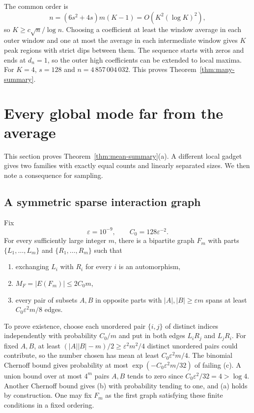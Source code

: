 \documentclass[11pt,a4paper]{article}
\theoremstyle{definition}
\theoremstyle{remark}
\begin{document}
The common order is
\[
n=(6s^2+4s)m(K-1)=O(K^2(\log K)^2),
\]
so $K\ge c\sqrt n/\log n$. Choosing a coefficient at least the window average in each outer window and one at most the average in each intermediate window gives $K$ peak regions with strict dips between them. The sequence starts with zeros and ends at $d_n=1$, so the outer high coefficients can be extended to local maxima. For $K=4$, $s=128$ and $n=4\,857\,004\,032$. This proves Theorem~\ref{thm:many-summary}.

\section{Every global mode far from the average}\label{sec:mode}
This section proves Theorem~\ref{thm:mean-summary}(a). A different local gadget gives two families with exactly equal counts and linearly separated sizes. We then note a consequence for sampling.

\subsection{A symmetric sparse interaction graph}
Fix
\[
\varepsilon=10^{-9},\qquad C_0=128\varepsilon^{-2}.
\]
For every sufficiently large integer $m$, there is a bipartite graph $F_m$ with parts $\{L_1,\ldots,L_m\}$ and $\{R_1,\ldots,R_m\}$ such that
\begin{enumerate}[label=(\alph*)]
\item exchanging $L_i$ with $R_i$ for every $i$ is an automorphism,
\item $M_F=|E(F_m)|\le2C_0m$,
\item every pair of subsets $A,B$ in opposite parts with $|A|,|B|\ge\varepsilon m$ spans at least $C_0\varepsilon^2m/8$ edges.
\end{enumerate}
To prove existence, choose each unordered pair $\{i,j\}$ of distinct indices independently with probability $C_0/m$ and put in both edges $L_iR_j$ and $L_jR_i$. For fixed $A,B$, at least $(|A||B|-m)/2\ge\varepsilon^2m^2/4$ distinct unordered pairs could contribute, so the number chosen has mean at least $C_0\varepsilon^2m/4$. The binomial Chernoff bound gives probability at most $\exp(-C_0\varepsilon^2m/32)$ of failing (c). A union bound over at most $4^m$ pairs $A,B$ tends to zero since $C_0\varepsilon^2/32=4>\log4$. Another Chernoff bound gives (b) with probability tending to one, and (a) holds by construction. One may fix $F_m$ as the first graph satisfying these finite conditions in a fixed ordering.
\end{document}
